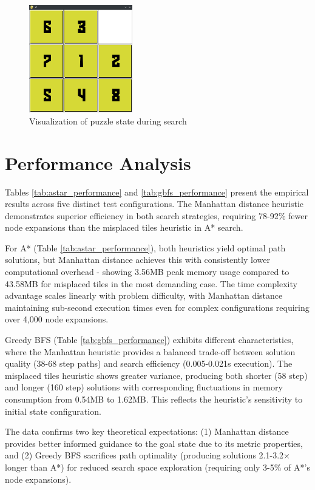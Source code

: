 \documentclass{report}
\begin{document}
\begin{figure}[h]
	\centering
	\includegraphics[width=0.4\textwidth]{assets/solver2}
	\caption{Visualization of puzzle state during search}
	\label{fig:solver}
\end{figure}



\section{Performance Analysis}
Tables \ref{tab:astar_performance} and \ref{tab:gbfs_performance} present the empirical results across five distinct test configurations. The Manhattan distance heuristic demonstrates superior efficiency in both search strategies, requiring 78-92\% fewer node expansions than the misplaced tiles heuristic in A* search. 

For A* (Table \ref{tab:astar_performance}), both heuristics yield optimal path solutions, but Manhattan distance achieves this with consistently lower computational overhead - showing 3.56MB peak memory usage compared to 43.58MB for misplaced tiles in the most demanding case. The time complexity advantage scales linearly with problem difficulty, with Manhattan distance maintaining sub-second execution times even for complex configurations requiring over 4,000 node expansions.

Greedy BFS (Table \ref{tab:gbfs_performance}) exhibits different characteristics, where the Manhattan heuristic provides a balanced trade-off between solution quality (38-68 step paths) and search efficiency (0.005-0.021s execution). The misplaced tiles heuristic shows greater variance, producing both shorter (58 step) and longer (160 step) solutions with corresponding fluctuations in memory consumption from 0.54MB to 1.62MB. This reflects the heuristic's sensitivity to initial state configuration.

The data confirms two key theoretical expectations: (1) Manhattan distance provides better informed guidance to the goal state due to its metric properties, and (2) Greedy BFS sacrifices path optimality (producing solutions 2.1-3.2$\times$ longer than A*) for reduced search space exploration (requiring only 3-5\% of A*'s node expansions).
\end{document}
